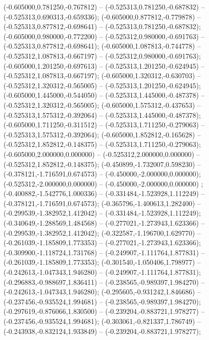  (-0.605000,0.781250,-0.767812) -- (-0.525313,0.781250,-0.687832) -- (-0.525313,0.690313,-0.659336);
 (-0.605000,0.877812,-0.779878) -- (-0.525313,0.877812,-0.698641) -- (-0.525313,0.781250,-0.687832);
 (-0.605000,0.980000,-0.772200) -- (-0.525312,0.980000,-0.691763) -- (-0.525313,0.877812,-0.698641);
 (-0.605000,1.087813,-0.744778) -- (-0.525312,1.087813,-0.667197) -- (-0.525312,0.980000,-0.691763);
 (-0.605000,1.201250,-0.697613) -- (-0.525313,1.201250,-0.624945) -- (-0.525312,1.087813,-0.667197);
 (-0.605000,1.320312,-0.630703) -- (-0.525312,1.320312,-0.565005) -- (-0.525313,1.201250,-0.624945);
 (-0.605000,1.445000,-0.544050) -- (-0.525313,1.445000,-0.487378) -- (-0.525312,1.320312,-0.565005);
 (-0.605000,1.575312,-0.437653) -- (-0.525313,1.575312,-0.392064) -- (-0.525313,1.445000,-0.487378);
 (-0.605000,1.711250,-0.311512) -- (-0.525313,1.711250,-0.279063) -- (-0.525313,1.575312,-0.392064);
 (-0.605000,1.852812,-0.165628) -- (-0.525312,1.852812,-0.148375) -- (-0.525313,1.711250,-0.279063);
 (-0.605000,2.000000,0.000000) -- (-0.525312,2.000000,0.000000) -- (-0.525312,1.852812,-0.148375);
 (-0.450899,-1.732007,0.598230) -- (-0.378121,-1.716591,0.674573) -- (-0.450000,-2.000000,0.000000);
 (-0.525312,-2.000000,0.000000) -- (-0.450000,-2.000000,0.000000) ;
 (-0.400882,-1.542776,1.000336) -- (-0.331484,-1.523928,1.112249) -- (-0.378121,-1.716591,0.674573);
 (-0.365796,-1.400613,1.282400) -- (-0.299539,-1.382952,1.412042) -- (-0.331484,-1.523928,1.112249);
 (-0.340649,-1.288569,1.484568) -- (-0.277021,-1.273943,1.623366) -- (-0.299539,-1.382952,1.412042);
 (-0.322587,-1.196700,1.629770) -- (-0.261039,-1.185809,1.773353) -- (-0.277021,-1.273943,1.623366);
 (-0.309900,-1.118724,1.731768) -- (-0.249907,-1.111764,1.877831) -- (-0.261039,-1.185809,1.773353);
 (-0.301540,-1.050406,1.798977) -- (-0.242613,-1.047343,1.946280) -- (-0.249907,-1.111764,1.877831);
 (-0.296883,-0.988697,1.836411) -- (-0.238565,-0.989397,1.984270) -- (-0.242613,-1.047343,1.946280);
 (-0.295605,-0.931242,1.846686) -- (-0.237456,-0.935524,1.994681) -- (-0.238565,-0.989397,1.984270);
 (-0.297619,-0.876066,1.830500) -- (-0.239204,-0.883721,1.978277) -- (-0.237456,-0.935524,1.994681);
 (-0.303061,-0.821337,1.786749) -- (-0.243938,-0.832124,1.933849) -- (-0.239204,-0.883721,1.978277);

